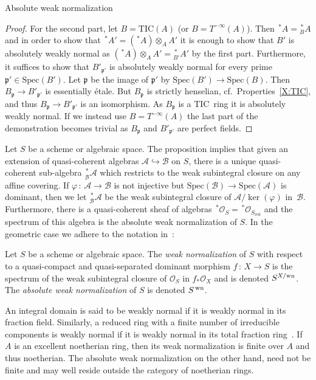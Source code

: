 \documentclass[a4paper,twoside,11pt]{amsart}[2009/07/02] %
\newcommand{\pref}[1]{\eqref{#1}}
\newcommand{\inj}{\hookrightarrow}
\newcommand{\map}[3]{#1\,:\, #2\rightarrow #3}
\newcommand{\etale}{\'{e}tale}
\newcommand{\Spec}{\mathrm{Spec}}
\newcommand{\red}{\mathrm{red}}
\newcommand\ip{\mathfrak{p}} %
\newcommand\sO{\mathcal{O}} %
\newcommand\sA{\mathcal{A}} %
\newcommand\sB{\mathcal{B}} %
\newcommand{\normcmd}[3]{%
#2%
\ifx\\#1\\%
^{\,\mathrm{#3}}%
\else%
^{#1/\mathrm{#3}}%
\fi%
}
\newcommand{\wn}[2]{\normcmd{#1}{#2}{wn}} %
\newcommand{\rwn}[2]{{^{\,*}_{#1}#2}} %
\newcommand{\TIC}{\mathrm{TIC}}
\begin{document}
\begin{section}{Absolute weak normalization}
\begin{proof}
For the second part, let $B=\TIC(A)$ (or $B=T^{-\infty}(A)$). Then
$\rwn{}{A}=\rwn{B}{A}$ and in order to show that
$\rwn{}{A'}=(\rwn{}{A})\otimes_A A'$ it is enough to show that $B'$ is
absolutely weakly normal as $(\rwn{}{A})\otimes_A A'=\rwn{B'}{A'}$ by the first
part. Furthermore, it suffices to show that $B'_{\ip'}$ is absolutely weakly
normal for every prime $\ip'\in\Spec(B')$. Let $\ip$ be the image of $\ip'$ by
$\Spec(B')\to \Spec(B)$. Then $B_\ip\to B'_{\ip'}$ is essentially
\etale{}. But $B_\ip$ is strictly henselian, cf.\ Properties~\pref{X:TIC}, and
thus $B_\ip\to B'_{\ip'}$ is an isomorphism. As $B_\ip$ is a TIC~ring it is
absolutely weakly normal. If we instead use $B=T^{-\infty}(A)$ the last part of
the demonstration becomes trivial as $B_\ip$ and $B'_{\ip'}$ are perfect
fields.
\end{proof}

Let $S$ be a scheme or algebraic space. The proposition implies that given an
extension of quasi-coherent algebras $\sA\inj \sB$ on $S$, there is a unique
quasi-coherent sub-algebra $\rwn{\sB}{\sA}$ which restricts to the weak
subintegral closure on any affine covering. If $\map{\varphi}{\sA}{\sB}$ is not
injective but $\Spec(\sB)\to\Spec(\sA)$ is dominant, then we let
$\rwn{\sB}{\sA}$ be the weak subintegral closure of $\sA/\ker(\varphi)$
in~$\sB$.
%
Furthermore, there is a quasi-coherent sheaf of algebras
$\rwn{}{\sO_S}=\rwn{}{\sO_{S_\red}}$ and the spectrum of this algebra is the
absolute weak normalization of $S$. In the geometric case we adhere to the
notation in~\cite[Ch.~I, 7.2]{kollar_rat_curves_book}:

\begin{definition}
Let $S$ be a scheme or algebraic space. The \emph{weak normalization} of $S$
with respect to a quasi-compact and quasi-separated dominant morphism
$\map{f}{X}{S}$ is the spectrum of the weak subintegral closure of $\sO_S$ in
$f_*\sO_X$ and is denoted $\wn{X}{S}$. The \emph{absolute weak normalization}
of $S$ is denoted $\wn{}{S}$.
\end{definition}

\begin{remark}
An integral domain is said to be weakly normal if it is weakly normal in its
fraction field. Similarly, a reduced ring with a finite number of irreducible
components is weakly normal if it is weakly normal in its total fraction
ring~\cite{manaresi, yanagihara_2}. If $A$ is an excellent noetherian ring,
then its weak normalization is finite over $A$ and thus noetherian. The
absolute weak normalization on the other hand, need not be finite and may well
reside outside the category of noetherian rings.


\end{remark}
\end{section}
\end{document}
